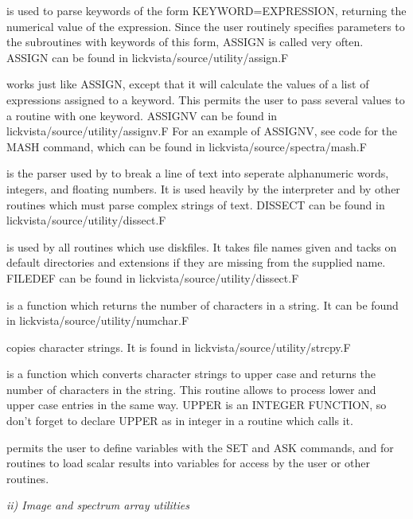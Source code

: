 \hhang
{}is used to parse keywords of the
form KEYWORD=EXPRESSION, returning the numerical value of the
expression.  Since the user routinely specifies parameters to the
subroutines with keywords of this form, ASSIGN is called very often. 
ASSIGN can be found in lickvista/source/utility/assign.F

\hhang {}works just like ASSIGN, except that it will calculate the
values of a list of expressions assigned to a keyword.  This permits
the user to pass several values to a routine with one keyword.  ASSIGNV
can be found in lickvista/source/utility/assignv.F
For an
example of ASSIGNV, see code for the MASH command, which can be found
in lickvista/source/spectra/mash.F

\hhang
{}is the parser used by \V to break
a line of text into seperate alphanumeric words, integers, and
floating numbers.  It is used heavily by the \V interpreter and by
other routines which must parse complex strings of text.  DISSECT can
be found in lickvista/source/utility/dissect.F

\hhang
{}is used by all routines which use
diskfiles. It takes file names given and tacks on default directories
and extensions if they are missing from the supplied name. FILEDEF can
be found in lickvista/source/utility/dissect.F

\hhang
{}is a function which returns the
number of characters in a string. It can be found in 
lickvista/source/utility/numchar.F

\hhang
{}copies character strings. 
It is found in lickvista/source/utility/strcpy.F

\hhang
{}is a function which converts
character strings to upper case and returns the number of
characters in the string.  This routine allows \V to process
lower and upper case entries in the same way.  UPPER is an 
INTEGER FUNCTION, so don't forget to declare UPPER as in integer 
in a routine which calls it.

\hhang
{}permits the user to define
variables with the SET and ASK commands, and for routines to load
scalar results into variables for access by the user or other
routines. 

\Sskip
\centerline  {\it ii) Image and spectrum array utilities\rm}

